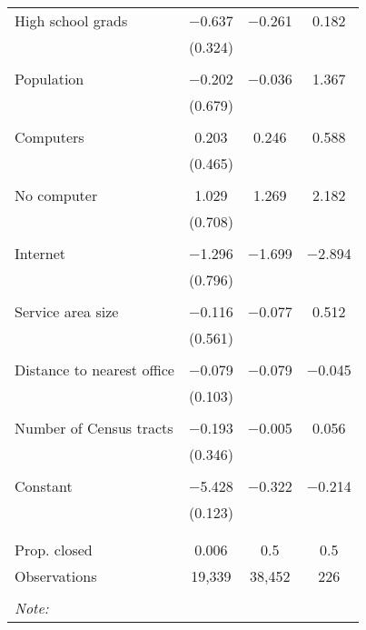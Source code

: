 \begin{table}[!htbp]
\begin{tabular}{@{\extracolsep{5pt}}lccc}
 High school grads & $-$0.637 & $-$0.261 & 0.182 \\ 
  & (0.324) &  &  \\ 
  & & & \\ 
 Population & $-$0.202 & $-$0.036 & 1.367 \\ 
  & (0.679) &  &  \\ 
  & & & \\ 
 Computers & 0.203 & 0.246 & 0.588 \\ 
  & (0.465) &  &  \\ 
  & & & \\ 
 No computer & 1.029 & 1.269 & 2.182 \\ 
  & (0.708) &  &  \\ 
  & & & \\ 
 Internet & $-$1.296 & $-$1.699 & $-$2.894 \\ 
  & (0.796) &  &  \\ 
  & & & \\ 
 Service area size & $-$0.116 & $-$0.077 & 0.512 \\ 
  & (0.561) &  &  \\ 
  & & & \\ 
 Distance to nearest office & $-$0.079 & $-$0.079 & $-$0.045 \\ 
  & (0.103) &  &  \\ 
  & & & \\ 
 Number of Census tracts & $-$0.193 & $-$0.005 & 0.056 \\ 
  & (0.346) &  &  \\ 
  & & & \\ 
 Constant & $-$5.428 & $-$0.322 & $-$0.214 \\ 
  & (0.123) &  &  \\ 
  & & & \\ 
\hline \\[-1.8ex] 
Prop. closed & 0.006 & 0.5 & 0.5 \\ 
Observations & 19,339 & 38,452 & 226 \\ 
\hline 
\hline \\[-1.8ex] 
\textit{Note:}  & \multicolumn{3}{r}{} \\ 
\end{tabular} 
\end{table} 
